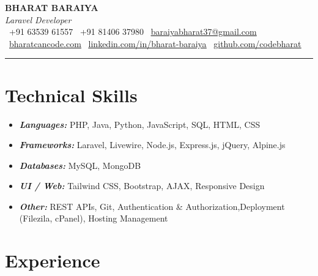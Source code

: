 \documentclass[10pt,a4paper]{article}
\begin{document}
\begin{center}

   {\LARGE \textbf{BHARAT BARAIYA}}\\[3pt]   %
{\small\textit{Laravel Developer}}\\[2pt]     %


    \small
    \faPhone\ +91 63539 61557 \quad
    \faWhatsapp\ +91 81406 37980 \quad
    \faEnvelope\ \href{mailto:baraiyabharat37@gmail.com}{\underline{baraiyabharat37@gmail.com}} \\[4pt]

    \faGlobe\ \href{https://bharatcancode.com}{\underline{bharatcancode.com}}
    \quad
    \faLinkedin\ \href{https://linkedin.com/in/bharat-baraiya}{\underline{linkedin.com/in/bharat-baraiya}}
    \quad
    \faGithub\ \href{https://github.com/codebharat
}{\underline{github.com/codebharat}}
\end{center}




\vspace{4pt}
\hrule
\vspace{8pt}




\section{Technical Skills}
\begin{itemize}
  \item \textit{\textbf{Languages:}} PHP, Java, Python, JavaScript, SQL, HTML, CSS
  \item \textit{\textbf{Frameworks:}} Laravel, Livewire, Node.js, Express.js, jQuery, Alpine.js
  \item \textit{\textbf{Databases:}} MySQL, MongoDB
  \item \textit{\textbf{UI / Web:}} Tailwind CSS, Bootstrap, AJAX, Responsive Design
  \item \textit{\textbf{Other:}} REST APIs, Git, Authentication \& Authorization,Deployment (Filezila, cPanel), Hosting Management
\end{itemize}



\section{Experience}
\end{document}
